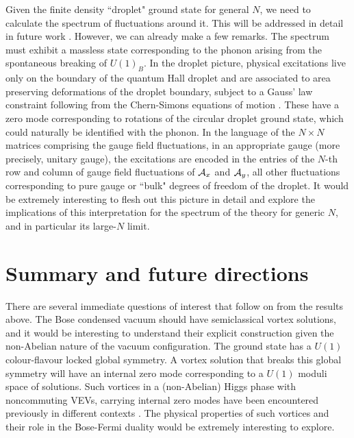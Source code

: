 Given the finite density ``droplet" ground state for general $N$, we need to calculate the spectrum of fluctuations around it. This will be addressed in detail in future work  \cite{ongoing}. However, we can already make a few remarks.  The spectrum must exhibit a massless state corresponding to the phonon arising from the spontaneous breaking of $U(1)_B$. In the droplet picture,  physical excitations live only on the boundary of the quantum Hall droplet and are associated to area preserving deformations of the droplet boundary, subject to a Gauss' law constraint following from the Chern-Simons equations of motion \cite{Polychronakos:2001mi}.  These have a zero mode corresponding to rotations of the circular droplet ground state, which could naturally be identified with the phonon.  In the language of the $N\times N$ matrices comprising the gauge field fluctuations, in an appropriate gauge (more precisely, unitary gauge), the excitations are encoded in the entries of the $N$-th row and column of gauge field fluctuations of ${\cal A}_x$ and ${\cal A}_y$, all other fluctuations corresponding to pure gauge or ``bulk" degrees of freedom  of the droplet. 
It would be extremely interesting to flesh out this picture in detail and explore the implications of this interpretation for the spectrum of the theory for generic $N$, and in particular its large-$N$ limit.
\section{Summary and future directions}
\label{sec5}
There are several immediate questions of interest that follow on from the results above.
The Bose condensed vacuum should have semiclassical vortex solutions, and it would be interesting to understand their explicit construction given the non-Abelian nature of the vacuum configuration. The ground state has a $U(1)$ colour-flavour locked global symmetry. A vortex solution that breaks this global symmetry will have an internal zero mode corresponding to a $U(1)$ moduli space of solutions.  Such vortices in a (non-Abelian) Higgs phase with noncommuting VEVs, carrying internal zero modes have been encountered previously in different contexts \cite{Markov:2004mj, Auzzi:2008ep, Auzzi:2009es}. The physical properties of such vortices and their role in the Bose-Fermi duality would be extremely interesting to explore.

